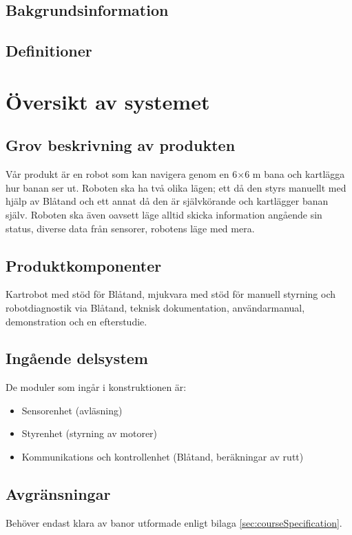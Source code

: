 \documentclass[a4paper,11pt]{article}
\begin{document}
\subsection{Bakgrundsinformation}
\subsection{Definitioner}


\section{Översikt av systemet}

\subsection{Grov beskrivning av produkten}
Vår produkt är en robot som kan navigera genom en 6$ \times $6 m bana och kartlägga hur banan ser ut. Roboten ska ha två olika lägen; ett då den styrs manuellt med hjälp av Blåtand och ett annat då den är självkörande och kartlägger banan själv. Roboten ska även oavsett läge alltid skicka information angående sin status, diverse data från sensorer, robotens läge med mera. 

\subsection{Produktkomponenter}
Kartrobot med stöd för Blåtand, mjukvara med stöd för manuell styrning och robotdiagnostik via Blåtand, teknisk dokumentation, användarmanual, demonstration och en efterstudie. 


\subsection{Ingående delsystem}
De moduler som ingår i konstruktionen är: %
\begin{itemize}
    \item Sensorenhet (avläsning) 
    \item Styrenhet (styrning av motorer) 
    \item Kommunikations och kontrollenhet (Blåtand, beräkningar av rutt) 
\end{itemize}

\subsection{Avgränsningar}
Behöver endast klara av banor utformade enligt bilaga \ref{sec:courseSpecification}. 
\end{document}
